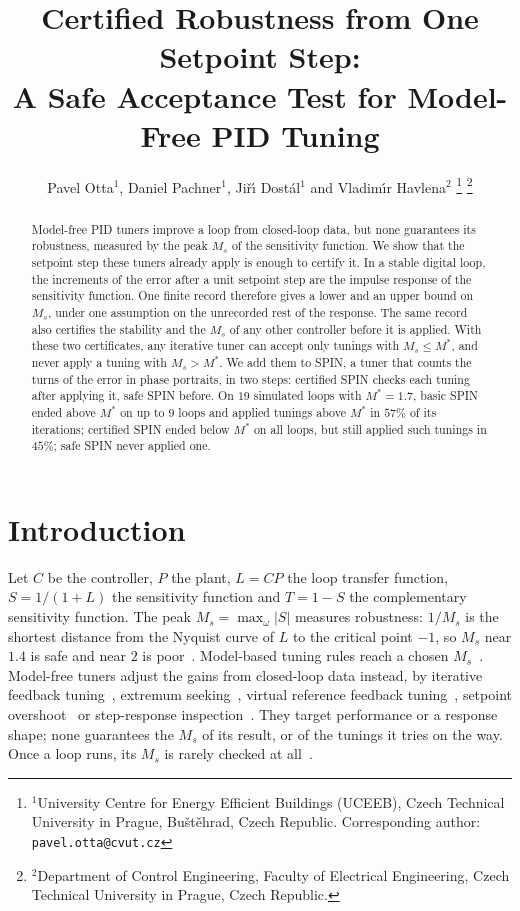 \documentclass[letterpaper, 10 pt, conference]{ieeeconf}
\title{\LARGE\bf Certified Robustness from One Setpoint Step:\\
A Safe Acceptance Test for Model-Free PID Tuning}
\author{Pavel Otta$^{1}$, Daniel Pachner$^{1}$, Ji\v{r}\'{\i} Dost\'al$^{1}$
and Vladim\'{\i}r Havlena$^{2}$%
\thanks{$^{1}$University Centre for Energy Efficient Buildings (UCEEB),
Czech Technical University in Prague, Bu\v{s}t\v{e}hrad, Czech Republic.
Corresponding author: {\tt pavel.otta@cvut.cz}}%
\thanks{$^{2}$Department of Control Engineering, Faculty of Electrical
Engineering, Czech Technical University in Prague, Czech Republic.}}
\newcommand{\spin}{SPIN\xspace}
\begin{document}
\maketitle
\thispagestyle{empty}
\pagestyle{empty}


\begin{abstract}
Model-free PID tuners improve a loop from closed-loop data, but none
guarantees its robustness, measured by the peak $M_s$ of the sensitivity
function. We show that the setpoint step these tuners already apply is
enough to certify it. In a stable digital loop, the increments of the
error after a unit setpoint step are the impulse response of the
sensitivity function. One finite record therefore gives a lower and an
upper bound on $M_s$, under one assumption on the unrecorded rest of the
response. The same record also certifies the stability and the $M_s$ of
any other controller before it is applied. With these two certificates,
any iterative tuner can accept only tunings with $M_s\le M^*$, and never
apply a tuning with $M_s>M^*$. We add them to \spin, a tuner that counts
the turns of the error in phase portraits, in two steps: certified \spin
checks each tuning after applying it, safe \spin before. On $19$
simulated loops with $M^*=1.7$, basic \spin ended above $M^*$ on up to
$9$ loops and applied tunings above $M^*$ in $57\%$ of its iterations;
certified \spin ended below $M^*$ on all loops, but still applied such
tunings in $45\%$; safe \spin never applied one.
\end{abstract}

\section{Introduction}

Let $C$ be the controller, $P$ the plant, $L=CP$ the loop transfer
function, $S=1/(1+L)$ the sensitivity function and $T=1-S$ the
complementary sensitivity function. The peak $M_s=\max_\omega|S|$
measures robustness: $1/M_s$ is the shortest distance from the Nyquist
curve of $L$ to the critical point $-1$, so $M_s$ near $1.4$ is safe and
near $2$ is poor~\cite{AstromHagglund2004}. Model-based tuning rules
reach a chosen $M_s$~\cite{AstromHagglund2004,Skogestad2003}. Model-free
tuners adjust the gains from closed-loop data instead, by iterative
feedback tuning~\cite{IFT1998}, extremum seeking~\cite{Killingsworth2006}, virtual reference feedback tuning~\cite{VRFT2002}, setpoint overshoot~\cite{Shamsuzzoha2010} or
step-response inspection~\cite{SPIN}. They target performance or a
response shape; none guarantees the $M_s$ of its result, or of the
tunings it tries on the way. Once a loop runs, its $M_s$ is rarely
checked at all~\cite{Desborough2002,Bauer2016}.
\end{document}
